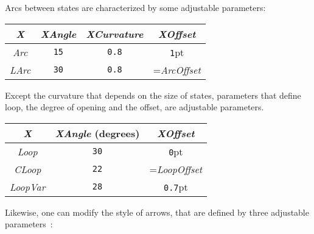 \documentclass[11pt,twoside]{article}
\newcommand{\noi}{\noindent}
\begin{document}
{Arcs between states are characterized by some adjustable parameters:

\begin{center}
\begin{tabular}{c|c|c|c|}
\textsl{X} & \textsl{XAngle} & \textsl{XCurvature} & \textsl{XOffset} \\
\hline
\textsl{Arc} & \texttt{15} & \texttt{0.8} & \texttt{1}pt\\
\hline
\textsl{LArc} & \texttt{30} & \texttt{0.8} & =\textsl{ArcOffset}\\
\hline
\end{tabular}
\end{center}

\medskip
Except the curvature that depends on the size of states,
parameters that define loop,
the degree of opening and the offset, are adjustable parameters.

\begin{center}
\begin{tabular}{c|c|c|}
\textsl{X} & \textsl{XAngle} (degrees) & \textsl{XOffset} \\
\hline
\textsl{Loop} & \texttt{30} & \texttt{0}pt\\
\hline
\textsl{CLoop} & \texttt{22} & =\textsl{LoopOffset}\\
\hline
\textsl{LoopVar} & \texttt{28} & \texttt{0.7}pt\\
\hline
\end{tabular}
\end{center}

\medskip
\noi
Likewise, one can modify the style of arrows, that are defined by 
three adjustable parameters~:


}
\end{document}
